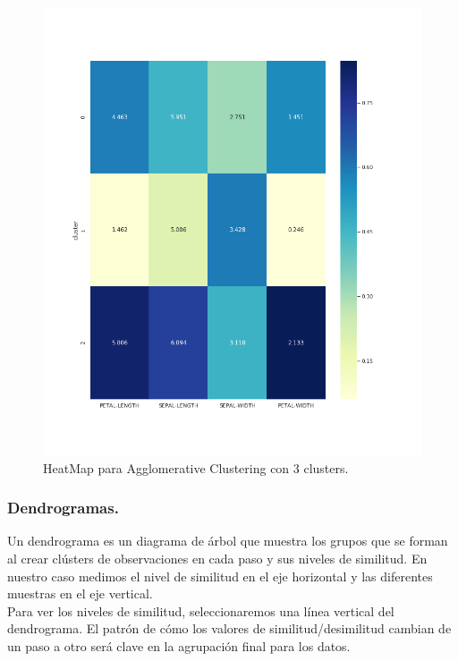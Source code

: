 \documentclass[a4paper, 20pt]{article}
\begin{document}
\begin{figure}[h]
\centering
\includegraphics[scale=0.63]{dani/heatmapAggClusterIRIS.png}
\caption{HeatMap para Agglomerative Clustering con 3 clusters.}
\label{hmac}
\end{figure}

\clearpage

\subsubsection{Dendrogramas.}

Un dendrograma es un diagrama de árbol que muestra los grupos que se forman al crear clústers de observaciones en cada paso y sus niveles de similitud. En nuestro caso medimos el nivel de similitud en el eje horizontal y las diferentes muestras en el eje vertical.\\

Para ver los niveles de similitud, seleccionaremos una línea vertical del dendrograma. El patrón de cómo los valores de similitud/desimilitud cambian de un paso a otro será clave en la agrupación final para los datos.\\
\end{document}
